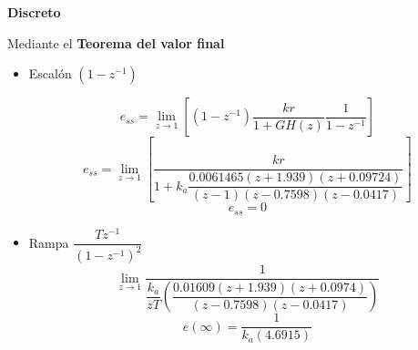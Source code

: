   \begin{center}
   \textbf{Discreto}
  \end{center}
  Mediante el \textbf{Teorema del valor final}
  \begin{itemize}
\item Escalón $(1-z^{-1})$

  \begin{equation}
    e_{ss}=\lim_{z\to 1} \left[(1-z^{-1})\dfrac{kr}{1+GH(z)}\dfrac{1}{1-z^{-1}}\right]
  \end{equation}
    \begin{equation}
          e_{ss}=\lim_{z\to 1} \left[\dfrac{kr}{1+k_a \dfrac{0.0061465 (z+1.939) (z+0.09724)}{(z-1) (z-0.7598) (z-0.0417)}}\right]
        \end{equation}
            \begin{equation}
          e_{ss}=0
        \end{equation}
        
  \item Rampa $\dfrac{Tz^{-1}}{(1-z^{-1})^2}$
    \begin{equation}
    \lim_{z\to 1} \dfrac{1}{\dfrac{k_a}{zT} \left(\dfrac{0.01609(z+1.939)(z+0.0974)}{(z-0.7598)(z-0.0417)}\right)}
  \end{equation}
    \begin{equation}
e(\infty) = \dfrac{1}{k_a(4.6915)}      
    \end{equation}
  \end{itemize}
  

